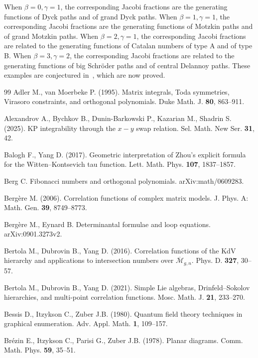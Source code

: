 \documentclass[a4paper]{article}
\theoremstyle{plain}
\theoremstyle{definition}
\begin{document}
When $\beta=0,\gamma=1$, the corresponding Jacobi fractions are the generating functions of Dyck paths and of grand Dyck paths. When $\beta=1,\gamma=1$, the corresponding Jacobi fractions are the generating functions of Motzkin paths and of grand Motzkin paths. When $\beta=2,\gamma=1$, the corresponding Jacobi fractions are related to the generating functions of Catalan numbers of type A and of type B. When $\beta=3,\gamma=2$, the corresponding Jacobi fractions are related to the generating functions of big Schr\"oder paths and of central Delannoy paths. These examples are conjectured in~\cite{Zhou2,Zhou3}, which are now proved.



\begin{thebibliography}{99}
Adler M., van Moerbeke P. (1995). Matrix integrals, Toda symmetries, Virasoro constraints, and orthogonal polynomials. Duke Math. J. {\bf 80}, 863--911.

Alexandrov A., Bychkov B., Dunin-Barkowski P., Kazarian M., Shadrin S. (2025). KP integrability through the $x-y$ swap relation. Sel. Math. New Ser. {\bf 31}, 42.

Balogh F., Yang D. (2017). Geometric interpretation of Zhou's explicit formula for the Witten--Kontsevich tau function. Lett. Math. Phys. {\bf 107}, 1837--1857.

Berg C. Fibonacci numbers and orthogonal polynomials. arXiv:math/0609283.

Berg\`ere M. (2006). Correlation functions of complex matrix models. J. Phys. A: Math. Gen. {\bf 39}, 8749--8773.

Berg\`ere M., Eynard B. Determinantal formulae and loop equations. arXiv:0901.3273v2.

Bertola M., Dubrovin B., Yang D. (2016). Correlation functions of the KdV hierarchy and applications to intersection numbers over $\overline{\mathcal{M}}_{g,n}$. Phys. D. {\bf 327}, 30--57.

Bertola M., Dubrovin B., Yang D. (2021). Simple Lie algebras, Drinfeld--Sokolov hierarchies, and multi-point correlation functions. Mosc. Math. J. {\bf 21}, 233--270.

Bessis D., Itzykson C., Zuber J.B. (1980). Quantum field theory techniques in graphical enumeration. Adv. Appl. Math. {\bf 1}, 109--157.

Br\'ezin E., Itzykson C., Parisi G., Zuber J.B. (1978). Planar diagrams. Comm. Math. Phys. {\bf 59}, 35--51.


\end{thebibliography}
\end{document}

